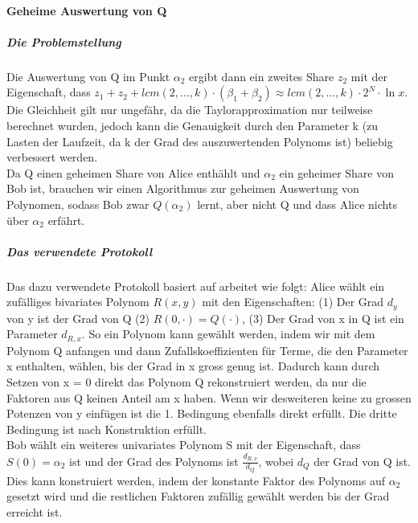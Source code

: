 \documentclass{article}
\begin{document}
\paragraph{Geheime Auswertung von Q}
\subparagraph{Die Problemstellung}
Die Auswertung von Q im Punkt \(\alpha_2\) ergibt dann ein zweites Share 
\(z_2\) mit der Eigenschaft, dass 
\(z_1 + z_2 + lcm(2,\dots,k)\cdot(\beta_1+\beta_2) \approx 
lcm(2,\dots,k)\cdot 2^N \cdot \ln x\). Die Gleichheit gilt nur ungef\"ahr,
da die Taylorapproximation nur teilweise berechnet wurden, jedoch kann
die Genauigkeit durch den Parameter k (zu Lasten der Laufzeit, da k der Grad
des auszuwertenden Polynoms ist)  beliebig verbessert werden.\\
Da Q einen geheimen Share von Alice enth\"ahlt und \(\alpha_2\) ein
geheimer Share von Bob ist, brauchen wir einen Algorithmus zur
geheimen Auswertung von Polynomen, sodass Bob zwar \(Q(\alpha_2)\) lernt, 
aber nicht Q und dass Alice nichts \"uber \(\alpha_2\) erf\"ahrt.
\subparagraph{Das verwendete Protokoll}
Das dazu verwendete Protokoll basiert auf \cite{ot} arbeitet wie folgt:
Alice w\"ahlt ein zuf\"alliges bivariates Polynom \(R(x, y)\) mit den 
Eigenschaften:  
 (1) Der Grad \(d_y\) von y ist der Grad von Q
 (2) \(R(0,\cdot) = Q(\cdot)\),
 (3) Der Grad von x in Q ist ein Parameter \(d_{R,x}\).
So ein Polynom kann gew\"ahlt werden, indem wir mit dem Polynom Q
anfangen und dann Zufallskoeffizienten f\"ur Terme, die den Parameter
x enthalten, w\"ahlen, bis der Grad in x gross genug ist. Dadurch
kann durch Setzen von x = 0 direkt das Polynom Q rekonstruiert werden,
da nur die Faktoren aus Q keinen Anteil am x haben. Wenn wir desweiteren
keine zu grossen Potenzen von y einf\"ugen ist die 1. Bedingung ebenfalls
direkt erf\"ullt.  Die dritte Bedingung ist nach Konstruktion erf\"ullt.\\
Bob w\"ahlt ein weiteres univariates Polynom S mit der Eigenschaft, dass
\(S(0) = \alpha_2\) ist und der Grad des Polynoms ist \(\frac{d_{R,x}}{d_Q}\),
wobei \(d_Q\) der Grad von Q ist. Dies kann konstruiert werden, indem 
der konstante Faktor des Polynoms auf \(\alpha_2\) gesetzt wird und
die restlichen Faktoren zuf\"allig gew\"ahlt werden bis der Grad erreicht ist.
\end{document}
